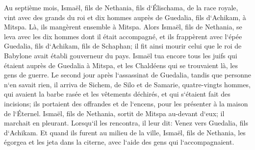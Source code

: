 \verse Au septième mois, Ismaël, fils de Nethania, fils d`Élischama, de la race royale, vint avec des grands du roi et dix hommes auprès de Guedalia, fils d`Achikam, à Mitspa. Là, ils mangèrent ensemble à Mitspa. 
\verse Alors Ismaël, fils de Nethania, se leva avec les dix hommes dont il était accompagné, et ils frappèrent avec l`épée Guedalia, fils d`Achikam, fils de Schaphan; il fit ainsi mourir celui que le roi de Babylone avait établi gouverneur du pays. 
\verse Ismaël tua encore tous les juifs qui étaient auprès de Guedalia à Mitspa, et les Chaldéens qui se trouvaient là, les gens de guerre. 
\verse Le second jour après l`assassinat de Guedalia, tandis que personne n`en savait rien, 
\verse il arriva de Sichem, de Silo et de Samarie, quatre-vingts hommes, qui avaient la barbe rasée et les vêtements déchirés, et qui s`étaient fait des incisions; ils portaient des offrandes et de l`encens, pour les présenter à la maison de l`Éternel. 
\verse Ismaël, fils de Nethania, sortit de Mitspa au-devant d`eux; il marchait en pleurant. Lorsqu`il les rencontra, il leur dit: Venez vers Guedalia, fils d`Achikam. 
\verse Et quand ils furent au milieu de la ville, Ismaël, fils de Nethania, les égorgea et les jeta dans la citerne, avec l`aide des gens qui l`accompagnaient. 
